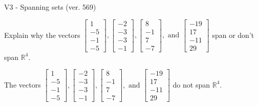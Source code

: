 \begin{exercise}
  \begin{exerciseTitle}V3 - Spanning sets (ver. 569)\end{exerciseTitle}
  \begin{exerciseStatement}
    Explain why the vectors \(\left[\begin{array}{r}
1 \\
-5 \\
-1 \\
-5
\end{array}\right] , \left[\begin{array}{r}
-2 \\
-3 \\
-3 \\
-1
\end{array}\right] , \left[\begin{array}{r}
8 \\
-1 \\
7 \\
-7
\end{array}\right] , \text{ and } \left[\begin{array}{r}
-19 \\
17 \\
-11 \\
29
\end{array}\right]\) span or don't span \(\mathbb{R}^4\). 
	


  \end{exerciseStatement}
  \begin{exerciseAnswer}
   The vectors \(\left[\begin{array}{r}
1 \\
-5 \\
-1 \\
-5
\end{array}\right] , \left[\begin{array}{r}
-2 \\
-3 \\
-3 \\
-1
\end{array}\right] , \left[\begin{array}{r}
8 \\
-1 \\
7 \\
-7
\end{array}\right] , \text{ and } \left[\begin{array}{r}
-19 \\
17 \\
-11 \\
29
\end{array}\right]\) 
  	 do not  
	span \(\mathbb{R}^4\).
  


  \end{exerciseAnswer}
\end{exercise}